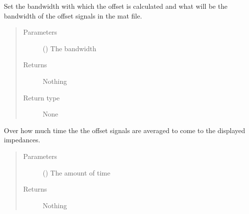 \documentclass[letterpaper,10pt,english]{sphinxmanual}
\begin{document}
\begin{fulllineitems}

\begin{fulllineitems}
\label{\detokenize{index:TiePieLCR_settings.TiePieLCR_settings.set_offset_bandwidth}}
\sphinxAtStartPar
Set the bandwidth with which the offset is calculated and what will be the bandwidth of the offset signals in the mat file.
\begin{quote}\begin{description}
\item[{Parameters}] \leavevmode
\sphinxAtStartPar
{} () \textendash{} The bandwidth

\item[{Returns}] \leavevmode
\sphinxAtStartPar
Nothing

\item[{Return type}] \leavevmode
\sphinxAtStartPar
None

\end{description}\end{quote}

\end{fulllineitems}


\begin{fulllineitems}
\label{\detokenize{index:TiePieLCR_settings.TiePieLCR_settings.set_offset_integration_time}}
\sphinxAtStartPar
Over how much time the the offset signals are averaged to come to the displayed impedances.
\begin{quote}\begin{description}
\item[{Parameters}] \leavevmode
\sphinxAtStartPar
{} () \textendash{} The amount of time

\item[{Returns}] \leavevmode
\sphinxAtStartPar
Nothing


\end{description}
\end{quote}
\end{fulllineitems}
\end{fulllineitems}
\end{document}
